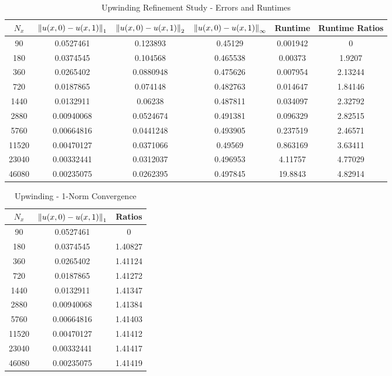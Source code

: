 \documentclass[12pt]{article}
\begin{document}
\begin{table}[H]
\caption{Upwinding Refinement Study - Errors and Runtimes}
\centering\begin{tabular}{||c|ccc|cc||}
\hline \hline
    $N_x$ & $\norm{u(x,0)-u(x,1)}_1$ & $\norm{u(x,0)-u(x,1)}_2$ & $\norm{u(x,0)-u(x,1)}_{\infty}$ &   Runtime &   Runtime Ratios \\
\hline
    90 &     0.0527461  &      0.123893  &         0.45129  &  0.001942 &          0       \\
   180 &     0.0374545  &      0.104568  &         0.465538 &  0.00373  &          1.9207  \\
   360 &     0.0265402  &      0.0880948 &         0.475626 &  0.007954 &          2.13244 \\
   720 &     0.0187865  &      0.074148  &         0.482763 &  0.014647 &          1.84146 \\
  1440 &     0.0132911  &      0.06238   &         0.487811 &  0.034097 &          2.32792 \\
  2880 &     0.00940068 &      0.0524674 &         0.491381 &  0.096329 &          2.82515 \\
  5760 &     0.00664816 &      0.0441248 &         0.493905 &  0.237519 &          2.46571 \\
 11520 &     0.00470127 &      0.0371066 &         0.49569  &  0.863169 &          3.63411 \\
 23040 &     0.00332441 &      0.0312037 &         0.496953 &  4.11757  &          4.77029 \\
 46080 &     0.00235075 &      0.0262395 &         0.497845 & 19.8843   &          4.82914 \\
\hline \hline
\end{tabular}
\end{table}
\begin{minipage}{0.5\textwidth}
\begin{table}[H]
\caption{Upwinding - 1-Norm Convergence}
\centering\begin{tabular}{||c|cc||}
\hline \hline
    $N_x$ &   $\norm{u(x,0)-u(x,1)}_1$ &   Ratios \\
\hline
    90 &     0.0527461  &  0       \\
   180 &     0.0374545  &  1.40827 \\
   360 &     0.0265402  &  1.41124 \\
   720 &     0.0187865  &  1.41272 \\
  1440 &     0.0132911  &  1.41347 \\
  2880 &     0.00940068 &  1.41384 \\
  5760 &     0.00664816 &  1.41403 \\
 11520 &     0.00470127 &  1.41412 \\
 23040 &     0.00332441 &  1.41417 \\
 46080 &     0.00235075 &  1.41419 \\
\hline \hline
\end{tabular}
\end{table}
\end{minipage}%
\end{document}
